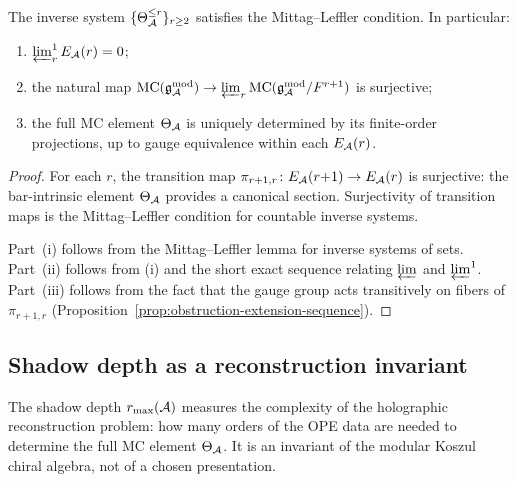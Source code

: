\begin{corollary}
\label{cor:mittag-leffler-shadow-tower}
The inverse system
$\{\Theta_{\mathcal{A}}^{\leq r}\}_{r \geq 2}$
satisfies the Mittag--Leffler condition. In particular:
\begin{enumerate}[label=\textup{(\roman*)}]
\item $\varprojlim^1_r E_{\mathcal{A}}(r) = 0$;
\item the natural map
 $\mathrm{MC}(\mathfrak{g}_{\mathcal{A}}^{\mathrm{mod}}) \to \varprojlim_r \mathrm{MC}(\mathfrak{g}_{\mathcal{A}}^{\mathrm{mod}} / F^{r+1})$
 is surjective;
\item the full MC element $\Theta_{\mathcal{A}}$ is uniquely determined
 by its finite-order projections, up to gauge equivalence
 within each $E_{\mathcal{A}}(r)$.
\end{enumerate}
\end{corollary}

\begin{proof}
For each $r$, the transition map
$\pi_{r+1,r} \colon E_{\mathcal{A}}(r{+}1) \to E_{\mathcal{A}}(r)$
is surjective: the bar-intrinsic element $\Theta_{\mathcal{A}}$
provides a canonical section. Surjectivity of
transition maps is the Mittag--Leffler condition
for countable inverse systems.

Part~(i) follows from the Mittag--Leffler lemma
for inverse systems of sets.
Part~(ii) follows from (i) and the short exact
sequence relating $\varprojlim$ and $\varprojlim^1$.
Part~(iii) follows from the fact that the gauge group
acts transitively on fibers of $\pi_{r+1,r}$
(Proposition~\ref{prop:obstruction-extension-sequence}).
\end{proof}


\subsection{Shadow depth as a reconstruction invariant}
\label{subsec:shadow-depth-invariant}

The shadow depth $r_{\max}(\mathcal{A})$ measures the complexity
of the holographic reconstruction problem: how many orders
of the OPE data are needed to determine the full
MC element $\Theta_{\mathcal{A}}$. It is an invariant of the
modular Koszul chiral algebra, not of a chosen presentation.

